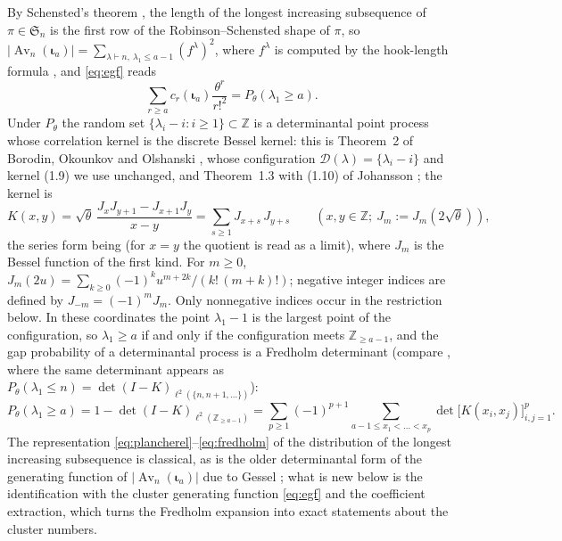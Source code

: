 \documentclass[11pt,reqno]{amsart}
\theoremstyle{plain}
\theoremstyle{definition}
\theoremstyle{remark}
\newcommand{\Av}{\operatorname{Av}}
\let\greekiota\iota
\renewcommand{\iota}{\boldsymbol{\greekiota}}
\newcommand{\Sym}{\mathfrak{S}}
\newcommand{\ZZ}{\mathbb{Z}}
\begin{document}
By Schensted's theorem \cite{Schensted1961}, the length of the longest increasing subsequence of $\pi\in\Sym_n$ is the first row of the Robinson--Schensted shape of $\pi$, so $|\Av_n(\iota_a)|=\sum_{\lambda\vdash n,\ \lambda_1\le a-1}(f^\lambda)^2$, where $f^\lambda$ is computed by the hook-length formula \cite{FRT1954}, and \eqref{eq:egf} reads
\begin{equation}\label{eq:plancherel}
\sum_{r\ge a}c_r(\iota_a)\frac{\theta^r}{r!^2}=P_\theta(\lambda_1\ge a).
\end{equation}
Under $P_\theta$ the random set $\{\lambda_i-i:i\ge1\}\subset\ZZ$ is a determinantal point process whose correlation kernel is the discrete Bessel kernel: this is Theorem~2 of Borodin, Okounkov and Olshanski \cite{BOO2000}, whose configuration $\mathcal D(\lambda)=\{\lambda_i-i\}$ and kernel (1.9) we use unchanged, and Theorem~1.3 with (1.10) of Johansson \cite{Johansson2001}; the kernel is
\begin{equation}\label{eq:kernel}
K(x,y)=\sqrt\theta\,\frac{J_xJ_{y+1}-J_{x+1}J_y}{x-y}=\sum_{s\ge1}J_{x+s}\,J_{y+s}\qquad(x,y\in\ZZ;\ J_m:=J_m(2\sqrt\theta)),
\end{equation}
the series form being \cite[Prop.~2.9]{BOO2000} (for $x=y$ the quotient is read as a limit), where $J_m$ is the Bessel function of the first kind. For $m\ge0$,
$J_m(2u)=\sum_{k\ge0}(-1)^k u^{m+2k}/(k!\,(m+k)!)$;
negative integer indices are defined by $J_{-m}=(-1)^mJ_m$.
Only nonnegative indices occur in the restriction below. In these coordinates the point $\lambda_1-1$ is the largest point of the configuration, so $\lambda_1\ge a$ if and only if the configuration meets $\ZZ_{\ge a-1}$, and the gap probability of a determinantal process is a Fredholm determinant (compare \cite[Thm.~1.3]{Johansson2001}, where the same determinant appears as $P_\theta(\lambda_1\le n)=\det(I-K)_{\ell^2(\{n,n+1,\dots\})}$):
\begin{equation}\label{eq:fredholm}
P_\theta(\lambda_1\ge a)=1-\det(I-K)_{\ell^2(\ZZ_{\ge a-1})}=\sum_{p\ge1}(-1)^{p+1}\sum_{a-1\le x_1<\dots<x_p}\det\bigl[K(x_i,x_j)\bigr]_{i,j=1}^p .
\end{equation}
The representation \eqref{eq:plancherel}--\eqref{eq:fredholm} of the distribution of the longest increasing subsequence is classical, as is the older determinantal form of the generating function of $|\Av_n(\iota_a)|$ due to Gessel \cite{Gessel1990}; what is new below is the identification with the cluster generating function \eqref{eq:egf} and the coefficient extraction, which turns the Fredholm expansion into exact statements about the cluster numbers.
\end{document}
